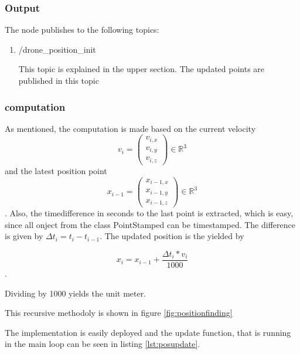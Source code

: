 	\subsubsection{Output}
	
	The node publishes to the following topics:
	
	\begin{enumerate}
	\item{/drone\_position\_init}
	
	This topic is explained in the upper section. The updated points are published in this topic
	
	\end{enumerate}
	
	\subsubsection{computation}
	
	As mentioned, the computation is made based on the current velocity $$v_i = \begin{pmatrix} v_{i,x} \\ v_{i,y} \\ v_{i,z} \end{pmatrix} \in \mathbb{R}^3$$ and the 
	latest position point $$x_{i-1} = \begin{pmatrix} x_{i-1,x} \\ x_{i-1,y} \\ x_{i-1, z} \end{pmatrix} \in \mathbb{R}^3$$. Also, the timedifference 
	in seconds to the last point is extracted, which is easy, since all onject from the class PointStamped can be timestamped. The difference is given by 
	$\Delta t_i =  t_i - t_{i-1}$. The updated position is the yielded by
	
	$$x_{i} = x_{i-1} + \frac{\Delta t_i * v_i}{1000} $$. 
	
	Dividing by 1000 yields the unit meter. 
	
	This recursive methodoly is shown in figure \ref{fig:positionfinding}
	
	
	The implementation is easily deployed and the update function, that is running in the main loop can be seen in listing \ref{lst:posupdate}. 
	
